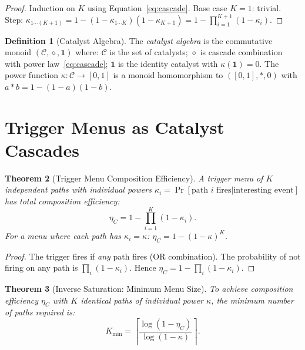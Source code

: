 \documentclass[twocolumn,10pt,a4paper]{article}
\theoremstyle{thmstyle}
\newtheorem{theorem}{Theorem}[section]
\theoremstyle{definition}
\newtheorem{definition}[theorem]{Definition}
\theoremstyle{remark}
\newcommand{\catpow}{\kappa}
\newcommand{\etaC}{\eta_{C}}
\begin{document}
\begin{proof}
Induction on $K$ using Equation~\eqref{eq:cascade}.
Base case $K=1$: trivial. Step: $\catpow_{1\cdots(K+1)}
= 1 - (1-\catpow_{1\cdots K})(1-\catpow_{K+1})
= 1 - \prod_{i=1}^{K+1}(1-\catpow_i)$.
\end{proof}

\begin{definition}[Catalyst Algebra]
\label{def:algebra}
The \emph{catalyst algebra} is the commutative monoid
$(\mathcal{C}, \diamond, \mathbf{1})$ where:
$\mathcal{C}$ is the set of catalysts;
$\diamond$ is cascade combination with power law~\eqref{eq:cascade};
$\mathbf{1}$ is the identity catalyst with $\catpow(\mathbf{1}) = 0$.
The power function $\catpow : \mathcal{C} \to [0,1]$ is a monoid
homomorphism to $([0,1], *, 0)$ with $a * b = 1-(1-a)(1-b)$.
\end{definition}

\section{Trigger Menus as Catalyst Cascades}
\label{sec:trigger}

\begin{theorem}[Trigger Menu Composition Efficiency]
\label{thm:trigger_menu}
A trigger menu of $K$ independent paths with individual powers
$\catpow_i = \Pr[\text{path } i \text{ fires} | \text{interesting event}]$
has total composition efficiency:
\begin{equation}
\etaC = 1 - \prod_{i=1}^K(1-\catpow_i).
\label{eq:eta_C}
\end{equation}
For a menu where each path has $\catpow_i = \catpow$:
$\etaC = 1 - (1-\catpow)^K$.
\end{theorem}

\begin{proof}
The trigger fires if \emph{any} path fires (OR combination).
The probability of not firing on any path is $\prod_i(1-\catpow_i)$.
Hence $\etaC = 1 - \prod_i(1-\catpow_i)$.
\end{proof}

\begin{theorem}[Inverse Saturation: Minimum Menu Size]
\label{thm:inverse_saturation}
To achieve composition efficiency $\etaC$ with $K$ identical paths
of individual power $\catpow$, the minimum number of paths required is:
\begin{equation}
K_{\min} = \left\lceil\frac{\log(1-\etaC)}{\log(1-\catpow)}\right\rceil.
\label{eq:Kmin}
\end{equation}
\end{theorem}
\end{document}

